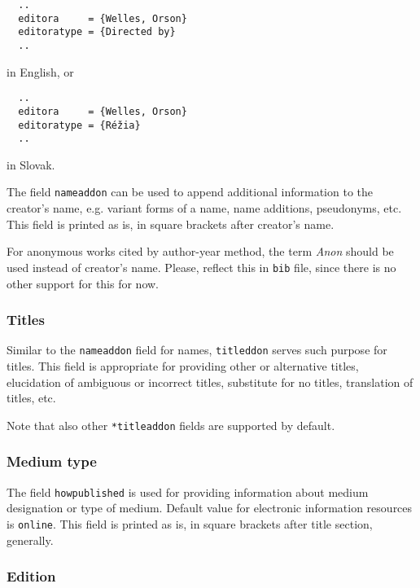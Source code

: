 \documentclass[a4paper,10pt]{ltxdockit}
\def\t|#1|{\texttt{#1}}
\begin{document}
\begin{verbatim}
  ..
  editora     = {Welles, Orson}
  editoratype = {Directed by}
  ..
\end{verbatim}

in English, or

\begin{verbatim}
  ..
  editora     = {Welles, Orson}
  editoratype = {Réžia}
  ..
\end{verbatim}

in Slovak.

The field \t|nameaddon| can be used to append additional information
to the creator's name, e.g. variant forms of a name, name additions,
pseudonyms, etc. This field is printed as is, in square brackets after
creator's name.

For anonymous works cited by author-year method, the term \textit{Anon}
should be used instead of creator's name. Please, reflect this
in \t|bib| file, since there is no other support for this for now.

\subsubsection{Titles}

Similar to the \t|nameaddon| field for names, \t|titleddon| serves such
purpose for titles. This field is appropriate for providing other or
alternative titles, elucidation of ambiguous or incorrect titles,
substitute for no titles, translation of titles, etc.

Note that also other \t|*titleaddon| fields are supported by default.

\subsubsection{Medium type}

The field \t|howpublished| is used for providing information about
medium designation or type of medium. Default value for electronic
information resources is \t|online|. This field is printed as is,
in square brackets after title section, generally.

\subsubsection{Edition}
\end{document}
